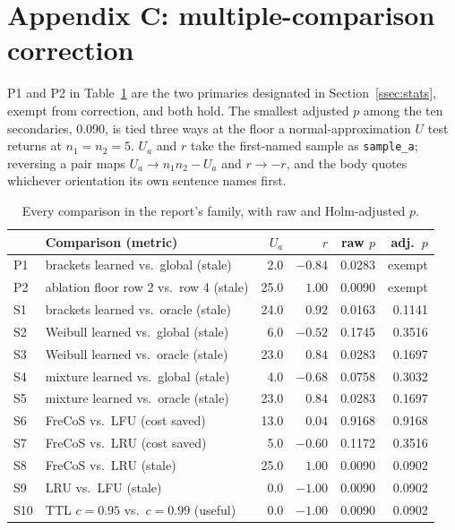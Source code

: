 \documentclass[10pt]{article}
\begin{document}
\section*{Appendix C: multiple-comparison correction}

P1 and P2 in Table~\ref{tab:holm} are the two primaries designated in
Section~\ref{ssec:stats}, exempt from correction, and both hold. The smallest adjusted $p$
among the ten secondaries, 0.090, is tied three ways at the floor a normal-approximation $U$
test returns at $n_1=n_2=5$. $U_a$ and $r$ take the first-named sample as
\texttt{sample\_a}; reversing a pair maps $U_a \to n_1 n_2 - U_a$ and $r \to -r$, and the
body quotes whichever orientation its own sentence names first.

\begin{table}[H]
\centering
\footnotesize
\caption{Every comparison in the report's family, with raw and Holm-adjusted $p$.}
\label{tab:holm}
\begin{tabular}{llrrrr}
\toprule
& Comparison (metric) & $U_a$ & $r$ & raw $p$ & adj.\ $p$ \\
\midrule
P1 & brackets learned vs.\ global (stale) & 2.0 & $-0.84$ & 0.0283 & exempt \\
P2 & ablation floor row 2 vs.\ row 4 (stale) & 25.0 & $1.00$ & 0.0090 & exempt \\
S1 & brackets learned vs.\ oracle (stale) & 24.0 & $0.92$ & 0.0163 & 0.1141 \\
S2 & Weibull learned vs.\ global (stale) & 6.0 & $-0.52$ & 0.1745 & 0.3516 \\
S3 & Weibull learned vs.\ oracle (stale) & 23.0 & $0.84$ & 0.0283 & 0.1697 \\
S4 & mixture learned vs.\ global (stale) & 4.0 & $-0.68$ & 0.0758 & 0.3032 \\
S5 & mixture learned vs.\ oracle (stale) & 23.0 & $0.84$ & 0.0283 & 0.1697 \\
S6 & FreCoS vs.\ LFU (cost saved) & 13.0 & $0.04$ & 0.9168 & 0.9168 \\
S7 & FreCoS vs.\ LRU (cost saved) & 5.0 & $-0.60$ & 0.1172 & 0.3516 \\
S8 & FreCoS vs.\ LRU (stale) & 25.0 & $1.00$ & 0.0090 & 0.0902 \\
S9 & LRU vs.\ LFU (stale) & 0.0 & $-1.00$ & 0.0090 & 0.0902 \\
S10 & TTL $c=0.95$ vs.\ $c=0.99$ (useful) & 0.0 & $-1.00$ & 0.0090 & 0.0902 \\
\bottomrule
\end{tabular}
\end{table}
\end{document}
